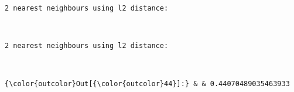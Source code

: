 \documentclass[11pt]{article}
\begin{document}
    \begin{Verbatim}[commandchars=\\\{\}]
2 nearest neighbours using l2 distance:

    \end{Verbatim}

    \begin{center}
    \end{center}
    { \hspace*{\fill} \\}

    \begin{Verbatim}[commandchars=\\\{\}]
2 nearest neighbours using l2 distance:

    \end{Verbatim}

    \begin{center}
    \end{center}
    { \hspace*{\fill} \\}

\begin{Verbatim}[commandchars=\\\{\}]
{\color{outcolor}Out[{\color{outcolor}44}]:} & & 0.44070489035463933
\end{Verbatim}
\end{document}
